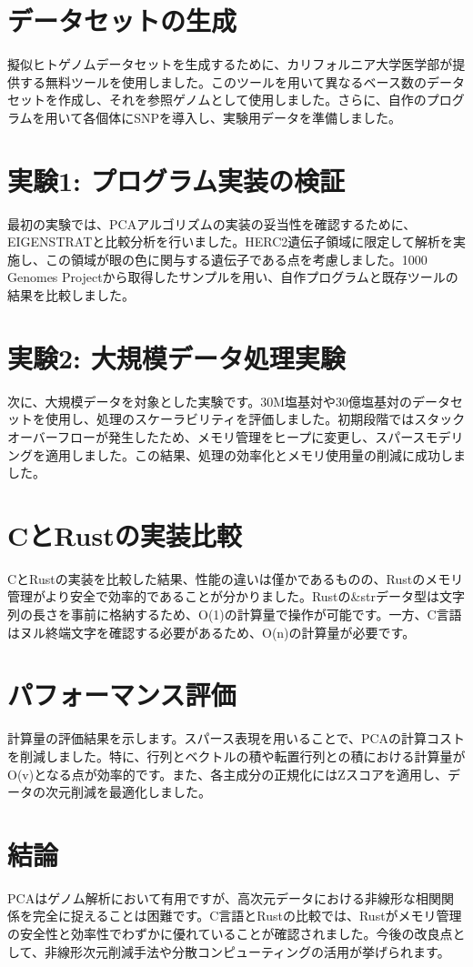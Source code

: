 \documentclass{article}
\begin{document}
\section*{データセットの生成}
擬似ヒトゲノムデータセットを生成するために、カリフォルニア大学医学部が提供する無料ツールを使用しました。このツールを用いて異なるベース数のデータセットを作成し、それを参照ゲノムとして使用しました。さらに、自作のプログラムを用いて各個体にSNPを導入し、実験用データを準備しました。

\section*{実験1: プログラム実装の検証}
最初の実験では、PCAアルゴリズムの実装の妥当性を確認するために、EIGENSTRATと比較分析を行いました。HERC2遺伝子領域に限定して解析を実施し、この領域が眼の色に関与する遺伝子である点を考慮しました。1000 Genomes Projectから取得したサンプルを用い、自作プログラムと既存ツールの結果を比較しました。

\section*{実験2: 大規模データ処理実験}
次に、大規模データを対象とした実験です。30M塩基対や30億塩基対のデータセットを使用し、処理のスケーラビリティを評価しました。初期段階ではスタックオーバーフローが発生したため、メモリ管理をヒープに変更し、スパースモデリングを適用しました。この結果、処理の効率化とメモリ使用量の削減に成功しました。

\section*{CとRustの実装比較}
CとRustの実装を比較した結果、性能の違いは僅かであるものの、Rustのメモリ管理がより安全で効率的であることが分かりました。Rustの\&strデータ型は文字列の長さを事前に格納するため、O(1)の計算量で操作が可能です。一方、C言語はヌル終端文字を確認する必要があるため、O(n)の計算量が必要です。

\section*{パフォーマンス評価}
計算量の評価結果を示します。スパース表現を用いることで、PCAの計算コストを削減しました。特に、行列とベクトルの積や転置行列との積における計算量がO(v)となる点が効率的です。また、各主成分の正規化にはZスコアを適用し、データの次元削減を最適化しました。

\section*{結論}
PCAはゲノム解析において有用ですが、高次元データにおける非線形な相関関係を完全に捉えることは困難です。C言語とRustの比較では、Rustがメモリ管理の安全性と効率性でわずかに優れていることが確認されました。今後の改良点として、非線形次元削減手法や分散コンピューティングの活用が挙げられます。
\end{document}
